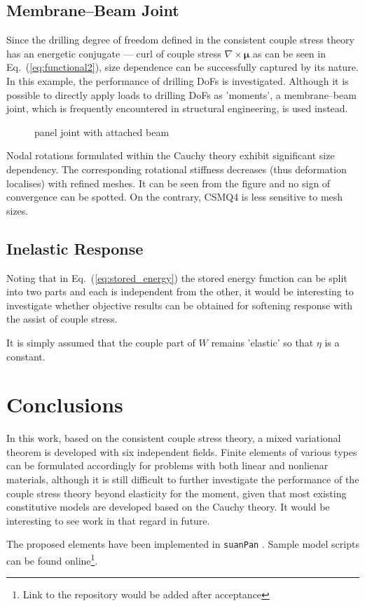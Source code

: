 \documentclass[3p,sort&compress,11pt,fleqn]{elsarticle}
\newcommand*{\eqsref}[1]{Eq.~(\ref{#1})}
\begin{document}
\subsection{Membrane--Beam Joint}
Since the drilling degree of freedom defined in the consistent couple stress theory has an energetic conjugate --- curl of couple stress $\nabla\times\mathbold{\mu}$ as can be seen in \eqsref{eq:functional2}, size dependence can be successfully captured by its nature. In this example, the performance of drilling DoFs is investigated. Although it is possible to directly apply loads to drilling DoFs as 'moments', a membrane--beam joint, which is frequently encountered in structural engineering, is used instead.
\begin{figure}[htb]
\centering\footnotesize
{}
\caption{panel joint with attached beam}\label{fig:joint_example}
\end{figure}

Nodal rotations formulated within the Cauchy theory exhibit significant size dependency. The corresponding rotational stiffness decreases (thus deformation localises) with refined meshes. It can be seen from the figure and no sign of convergence can be spotted. On the contrary, CSMQ4 is less sensitive to mesh sizes.
\subsection{Inelastic Response}
Noting that in \eqsref{eq:stored_energy} the stored energy function can be split into two parts and each is independent from the other, it would be interesting to investigate whether objective results can be obtained for softening response with the assist of couple stress.

It is simply assumed that the couple part of $W$ remains 'elastic' so that $\eta$ is a constant.
\section{Conclusions}
In this work, based on the consistent couple stress theory, a mixed variational theorem is developed with six independent fields. Finite elements of various types can be formulated accordingly for problems with both linear and nonlienar materials, although it is still difficult to further investigate the performance of the couple stress theory beyond elasticity for the moment, given that most existing constitutive models are developed based on the Cauchy theory. It would be interesting to see work in that regard in future.

The proposed elements have been implemented in \texttt{suanPan} \citep{Chang2021}. Sample model scripts can be found online\footnote{Link to the repository would be added after acceptance}.

\end{document}
